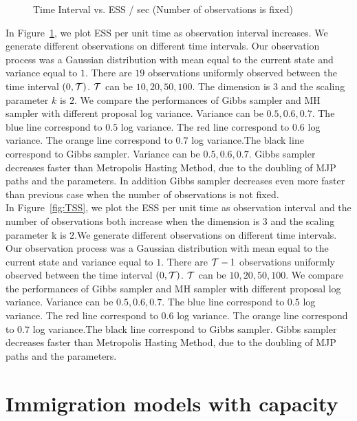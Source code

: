 \begin{figure}
\begin{minipage}[hp]{0.45\linewidth}
    \vspace{-0 in}
  \end{minipage}
    \caption{Time Interval vs. ESS / sec (Number of observations is fixed)}
     \label{fig:TSS_fix}
  \end{figure}
In Figure~\ref{fig:TSS_fix}, we plot ESS per unit time as observation interval 
increases. We generate different observations on different time intervals. 
Our observation process was a Gaussian distribution with mean equal to the 
current state and variance equal to $1$. There are $19$ observations uniformly 
observed between the time interval $(0, {\mathcal T})$. ${\mathcal T}$ can be $10, 20, 50, 100$. 
The dimension is $3$ and the scaling parameter $k$ is $2$. We compare the 
performances of Gibbs sampler and MH sampler with different proposal log 
variance. Variance can be $0.5, 0.6, 0.7$. The blue line correspond to $0.5$ 
log variance. The red line correspond to $0.6$ log variance. The orange line 
correspond to $0.7$ log variance.The black line correspond to Gibbs sampler.  
Variance can be $0.5, 0.6, 0.7$. Gibbs sampler decreases faster than Metropolis 
Hasting Method, due to the doubling of MJP paths and the parameters. In 
addition Gibbs sampler decreases even more faster than previous case when the 
number of observations is not fixed. \\

In Figure~\ref{fig:TSS}, we plot the ESS per unit time as observation interval 
and the number of observations both increase when the dimension is $3$ and the 
scaling parameter k is $2$.We generate different observations on different time 
intervals. Our observation process was a Gaussian distribution with mean equal 
to the current state and variance equal to $1$. There are ${\mathcal T} - 1$ observations
uniformly observed between the time interval $(0, {\mathcal T})$. ${\mathcal T}$ can be $10, 20, 
50, 100$. We compare the performances of Gibbs sampler and MH sampler with 
different proposal log variance. Variance can be $0.5, 0.6, 0.7$. The blue line 
correspond to $0.5$ log variance. The red line correspond to $0.6$ log variance.
The orange line correspond to $0.7$ log variance.The black line correspond to 
Gibbs sampler. Gibbs sampler decreases faster than Metropolis Hasting Method, 
due to the doubling of MJP paths and the parameters. \\



\section{Immigration models with capacity}~

